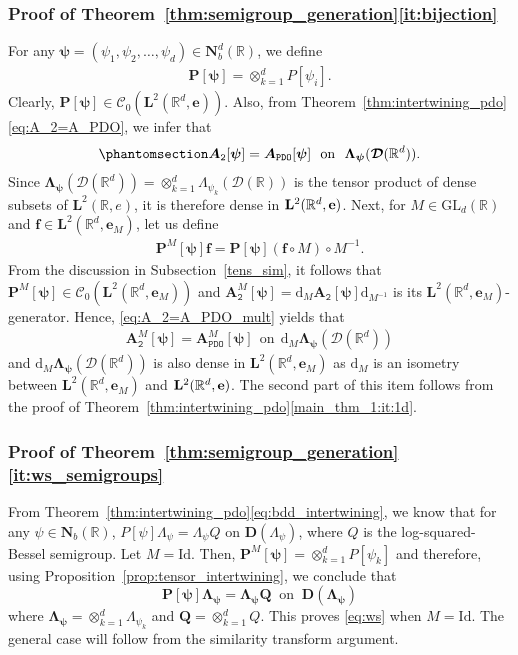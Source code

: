 \documentclass[12pt]{amsart}
\newcommand{\hlabel}{\phantomsection\label}
\numberwithin{equation}{section}
\newcommand{\bb}{\mathbb}
\newcommand{\cc}{\mathcal}
\newcommand{\ttt}{\mathtt}
\newcommand{\bmrm}[2][2]{\mathbf{#2}^{#1}}
\newcommand{\FsemiM}{\bm{P}^M[\bm{\psi}]}
\newcommand{\D}{\mathbf{D}}
\newcommand{\LRe}{\bmrm{L}(\bb{R},e)}
\newcommand{\LLRe}{\bmrm{L}(\bb R^d,{\bf e})}
\newcommand{\f}{\mathbf{f}}
\newcommand{\cD}{\mathcal{D}}
\newcommand{\LLReM}{\bmrm{L}(\bb R^d,\mathbf{e}_M)}
\theoremstyle{definition}
\theoremstyle{assump}
\theoremstyle{remark}
\begin{document}
{\subsubsection{Proof of Theorem~\ref{thm:semigroup_generation}\eqref{it:bijection}} For any $\bm{\psi}=(\psi_1,\psi_2,\ldots,\psi_d)\in\mathbf{N}^d_b(\bb{R})$, we define
\begin{align*}
\bm{P}[\bm{\psi}]=\otimes_{k=1}^d P[\psi_i].
\end{align*}
Clearly, $\bm{P}[\bm{\psi}]\in\cc{C}_0(\bmrm{L}(\bb{R}^d,\mathbf{e}))$. Also, from Theorem~\ref{thm:intertwining_pdo}\eqref{eq:A_2=A_PDO}, we infer that
\begin{align}\hlabel{eq:A_2=A_PDO_mult}
	\bm{A}_\ttt{2}[\bm\psi]=\bm{A}_{\ttt{PDO}}[\bm\psi] \ \ \text{on} \ \ \bm{\Lambda_\psi}(\bm{\cD}(\bb R^d)).
\end{align}
Since $\bm{\Lambda_\psi}(\bm{\cD}(\bb R^d))=\otimes_{k=1}^d \Lambda_{\psi_k}(\cD(\bb R))$ is the tensor product of dense subsets of $\LRe$, it is therefore dense in $\LLRe$. Next, for $M\in\mathrm{GL}_d(\bb R)$ and  $\f\in\bmrm{L}(\bb{R}^d,{\mathbf{e}}_M)$, let us define
\begin{align*}
\FsemiM\f=\bm{P}[\bm{\psi}](\f\circ M)\circ M^{-1}.
\end{align*}
From the discussion in Subsection~\ref{tens_sim}, it follows that $\FsemiM\in\cc{C}_0(\bmrm{L}(\bb R^d,\mathbf{e}_M))$ and $\bm{A}^M_\ttt{2}[\bm\psi]=\mathrm{d}_M\bm{A}_\ttt{2}[\bm\psi]\mathrm{d}_{M^{-1}}$ is its $\bmrm{L}(\bb R^d,\mathbf{e}_M)$-generator. Hence, \eqref{eq:A_2=A_PDO_mult} yields that
\begin{align*}
	\bm{A}^M_\ttt{2}[\bm\psi]=\bm{A}^M_{\ttt{PDO}}[\bm\psi] \ \ \text{on} \ \ \mathrm{d}_{M}\bm{\Lambda_\psi}(\bm{\cD}(\bb R^d))
\end{align*}
and $\mathrm{d}_{M}\bm{\Lambda_\psi}(\bm{\cD}(\bb R^d))$ is also dense in $\LLReM$ as $\mathrm{d}_M$ is an isometry between $\LLReM$ and $\LLRe$.
The second part of this item follows from the proof of Theorem~\ref{thm:intertwining_pdo}\eqref{main_thm_1:it:1d}.
\subsubsection{Proof of Theorem~\ref{thm:semigroup_generation}\eqref{it:ws_semigroups}} From Theorem~\ref{thm:intertwining_pdo}\eqref{eq:bdd_intertwining}, we know that for any $\psi\in\mathbf{N}_b(\bb{R})$, $P[\psi]\Lambda_\psi=\Lambda_\psi Q$ on $\D(\Lambda_\psi)$, where $Q$ is the log-squared-Bessel semigroup. Let $M=\mathrm{Id}$. Then, $\bm{P}^M[\bm{\psi}]=\otimes_{k=1}^d P[\psi_k]$ and therefore, using Proposition~\ref{prop:tensor_intertwining}, we conclude that
\[\bm{P}[\bm{\psi}]\bm{\Lambda}_{\bm{\psi}}=\bm{\Lambda}_{\bm{\psi}}\bm{Q} \ \text{ on } \ \D(\bm{\Lambda_\psi}) \] where $\bm{\Lambda_\psi}=\otimes_{k=1}^d\Lambda_{\psi_k}$ and $\bm{Q}=\otimes_{k=1}^d Q$. This proves \eqref{eq:ws} when $M=\mathrm{Id}$. The general case will follow from the similarity transform argument.

}
\end{document}
